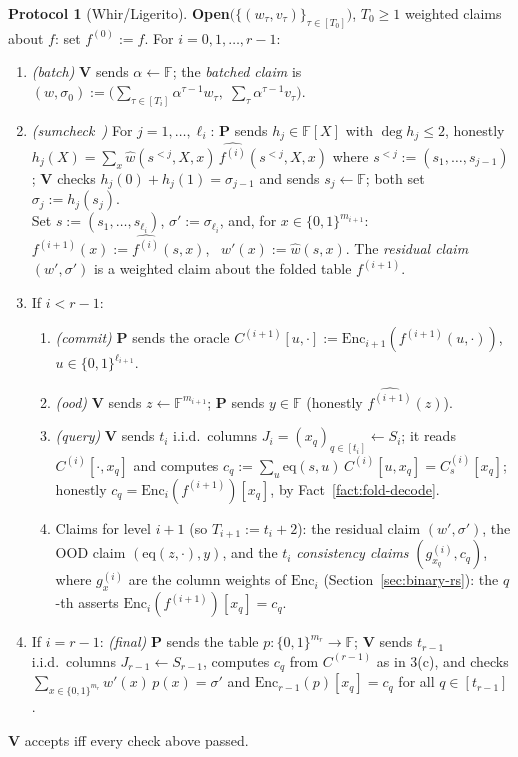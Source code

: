 \documentclass[11pt]{article}
\newcommand{\F}{\mathbb{F}}
\newcommand{\eq}{\mathrm{eq}}
\newcommand{\Enc}{\mathrm{Enc}}
\newcommand{\cube}[1]{\{0,1\}^{#1}}
\newcommand{\pol}[1]{\widehat{#1}}
\theoremstyle{plain}
\theoremstyle{definition}
\newtheorem{protocol}[theorem]{Protocol}
\theoremstyle{remark}
\begin{document}
\begin{protocol}[Whir/Ligerito]
\smallskip
\textbf{Open}$\bigl(\{(w_\tau, v_\tau)\}_{\tau \in [T_0]}\bigr)$, $T_0 \ge 1$ weighted claims about $f$: set $f^{(0)} := f$. For $i = 0, 1, \dots, r - 1$:
\begin{enumerate}[itemsep=0.5pt,topsep=2pt]
\item \emph{(batch)} $\mathbf{V}$ sends $\alpha \leftarrow \F$; the \emph{batched claim} is $(w, \sigma_0) := \bigl(\sum_{\tau \in [T_i]} \alpha^{\tau-1} w_\tau,\; \sum_{\tau} \alpha^{\tau-1} v_\tau\bigr)$.
\item \emph{(sumcheck~\cite{LFKN92})} For $j = 1, \dots, \ell_i$: $\mathbf{P}$ sends $h_j \in \F[X]$ with $\deg h_j \le 2$, honestly $h_j(X) = \sum_{x} \pol{w}(s^{<j}, X, x)\, \pol{f^{(i)}}(s^{<j}, X, x)$ where $s^{<j} := (s_1, \dots, s_{j-1})$; $\mathbf{V}$ checks $h_j(0) + h_j(1) = \sigma_{j-1}$ and sends $s_j \leftarrow \F$; both set $\sigma_j := h_j(s_j)$.\\
Set $s := (s_1, \dots, s_{\ell_i})$, $\sigma' := \sigma_{\ell_i}$, and, for $x \in \cube{m_{i+1}}$: \ $f^{(i+1)}(x) := \pol{f^{(i)}}(s, x)$, \ $w'(x) := \pol{w}(s, x)$. The \emph{residual claim} $(w', \sigma')$ is a weighted claim about the folded table $f^{(i+1)}$.
\item If $i < r - 1$:
\begin{enumerate}[itemsep=0.5pt,topsep=1pt,label=(\alph*)]
\item \emph{(commit)} $\mathbf{P}$ sends the oracle $C^{(i+1)}[u, \cdot] := \Enc_{i+1}(f^{(i+1)}(u, \cdot))$, $u \in \cube{\ell_{i+1}}$.
\item \emph{(ood)} $\mathbf{V}$ sends $z \leftarrow \F^{m_{i+1}}$; $\mathbf{P}$ sends $y \in \F$ (honestly $\pol{f^{(i+1)}}(z)$).
\item \emph{(query)} $\mathbf{V}$ sends $t_i$ i.i.d.\ columns $J_i = (x_q)_{q \in [t_i]} \leftarrow S_i$; it reads $C^{(i)}[\cdot, x_q]$ and computes $c_q := \sum_{u} \eq(s, u)\, C^{(i)}[u, x_q] = C^{(i)}_s[x_q]$; honestly $c_q = \Enc_i(f^{(i+1)})[x_q]$, by Fact~\ref{fact:fold-decode}.
\item Claims for level $i+1$ (so $T_{i+1} := t_i + 2$): the residual claim $(w', \sigma')$, the OOD claim $(\eq(z, \cdot), y)$, and the $t_i$ \emph{consistency claims} $(g^{(i)}_{x_q}, c_q)$, where $g^{(i)}_x$ are the column weights of $\Enc_i$ (Section~\ref{sec:binary-rs}): the $q$-th asserts $\Enc_i(f^{(i+1)})[x_q] = c_q$.
\end{enumerate}
\item If $i = r - 1$: \emph{(final)} $\mathbf{P}$ sends the table $p : \cube{m_r} \to \F$; $\mathbf{V}$ sends $t_{r-1}$ i.i.d.\ columns $J_{r-1} \leftarrow S_{r-1}$, computes $c_q$ from $C^{(r-1)}$ as in 3(c), and checks $\sum_{x \in \cube{m_r}} w'(x)\, p(x) = \sigma'$ and $\Enc_{r-1}(p)[x_q] = c_q$ for all $q \in [t_{r-1}]$.
\end{enumerate}
$\mathbf{V}$ accepts iff every check above passed.
\end{protocol}
\end{document}

